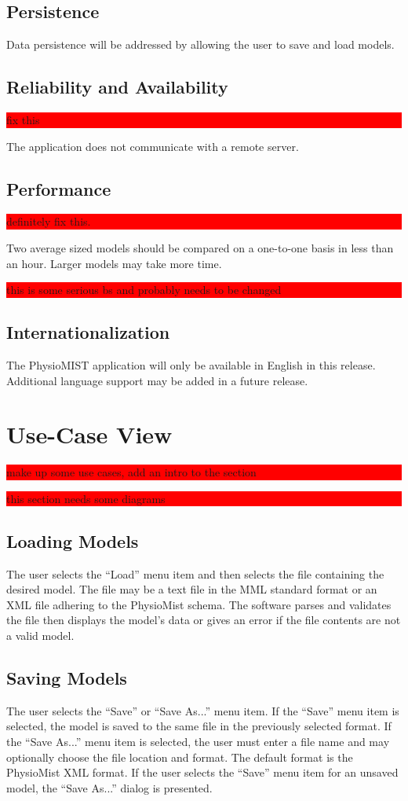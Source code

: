 \documentclass{article}
\newcommand{\todo}[1]{\colorbox{red}{\begin{minipage}{\textwidth}{#1}\end{minipage}}}
\begin{document}
\subsection{Persistence}
Data persistence will be addressed by allowing the user to save and load models.
\subsection{Reliability and Availability}
\todo{fix this}
The application does not communicate with a remote server.
\subsection{Performance}
\todo{definitely fix this.}
Two average sized models should be compared on a one-to-one basis in less than an hour.  Larger models may take more time.
\todo{this is some serious bs and probably needs to be changed}
\subsection{Internationalization}
The PhysioMIST application will only be available in English in this release. Additional language support may be added in a future release.

\section{Use-Case View}
\todo{make up some use cases, add an intro to the section}
\todo{this section needs some diagrams}
\subsection{Loading Models}
The user selects the ``Load'' menu item and then selects the file containing the desired model. The file may be a text file in the MML standard format or an XML file adhering to the PhysioMist schema. The software parses and validates the file then displays the model's data or gives an error if the file contents are not a valid model.
\subsection{Saving Models}
The user selects the ``Save'' or ``Save As...'' menu item. If the ``Save'' menu item is selected, the model is saved to the same file in the previously selected format. If the ``Save As...'' menu item is selected, the user must enter a file name and may optionally choose the file location and format. The default format is the PhysioMist XML format. If the user selects the ``Save'' menu item for an unsaved model, the ``Save As...'' dialog is presented.
\end{document}
